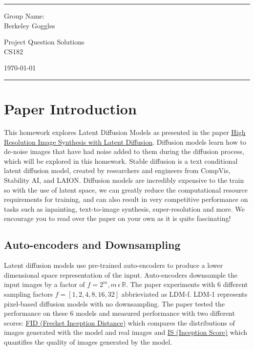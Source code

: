 \documentclass[a4paper]{article}
\begin{document}
\fancyhead[C]{}
\hrule \medskip %
\begin{minipage}{0.295\textwidth} 
\raggedright
\footnotesize
Group Name: \hfill \\
Berkeley Goggles
\end{minipage}
\begin{minipage}{0.4\textwidth} 
\centering 
\large 
Project Question Solutions\\ 
\normalsize 
CS182\\ 
\end{minipage}
\begin{minipage}{0.295\textwidth} 
\raggedleft
\today\hfill\\
\end{minipage}
\medskip\hrule 
\bigskip
\section{Paper Introduction}
This homework explores Latent Diffusion Models as presented in the paper \href{https://arxiv.org/pdf/2112.10752.pdf}{High Resolution Image Synthesis with Latent Diffusion}. Diffusion models learn how to de-noise images that have had noise added to them during the diffusion process, which will be explored in this homework. Stable diffusion is a text conditional latent diffusion model, created by researchers and engineers from CompVis, Stability AI, and LAION. Diffusion models are incredibly expensive to the train so with the use of latent space, we can greatly reduce the computational resource requirements for training, and can also result in very competitive performance on tasks such as inpainting, text-to-image synthesis, super-resolution and more. We encourage you to read over the paper on your own as it is quite fascinating!

\subsection{Auto-encoders and Downsampling}
Latent diffusion models use pre-trained auto-encoders to produce a lower dimensional space representation of the input.
Auto-encoders downsample the input images by a factor of \(f=2^m, m  \, \epsilon \, \mathbb{R}\). The paper experiments with 6 different sampling factors \(f=[1, 2, 4, 8, 16, 32]\) abbrieviated as LDM-f. LDM-1 represents pixel-based diffusion models with no downsampling. The paper tested the performance on these 6 models and measured performance with two different scores: \href{https://en.wikipedia.org/wiki/Fr%C3%A9chet_inception_distance}{FID (Frechet Inception Distance)} which compares the distributions of images generated with the model and real images and \href{https://en.wikipedia.org/wiki/Inception_score}{IS (Inception Score)} which quantifies the quality of images generated by the model.
\end{document}

